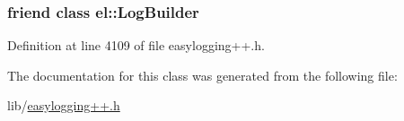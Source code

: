 \hypertarget{classel_1_1base_1_1_storage_a8c584bcf767a4d007311a7408b22ad62}{}
\subsubsection[{el\+::\+Log\+Builder}]{\setlength{\rightskip}{0pt plus 5cm}friend class {\bf el\+::\+Log\+Builder}\hspace{0.3cm}{\ttfamily [friend]}}\label{classel_1_1base_1_1_storage_a8c584bcf767a4d007311a7408b22ad62}


Definition at line 4109 of file easylogging++.\+h.



The documentation for this class was generated from the following file\+:\begin{DoxyCompactItemize}
\item 
lib/\hyperlink{easylogging_09_09_8h}{easylogging++.\+h}\end{DoxyCompactItemize}
